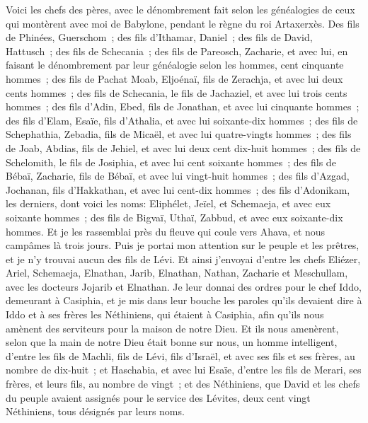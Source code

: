 \begin{multicols}{2}
\VerseOne{}Voici les chefs des pères, avec le dénombrement fait selon les généalogies de ceux qui montèrent avec moi de Babylone, pendant le règne du roi Artaxerxès.
Des fils de Phinées, Guerschom~; des fils d'Ithamar, Daniel~; des fils de David, Hattusch~;
des fils de Schecania~; des fils de Pareosch, Zacharie, et avec lui, en faisant le dénombrement par leur généalogie selon les hommes, cent cinquante hommes~;
des fils de Pachat Moab, Eljoénaï, fils de Zerachja, et avec lui deux cents hommes~;
des fils de Schecania, le fils de Jachaziel, et avec lui trois cents hommes~;
des fils d'Adin, Ebed, fils de Jonathan, et avec lui cinquante hommes~;
des fils d'Elam, Esaïe, fils d'Athalia, et avec lui soixante-dix hommes~;
des fils de Schephathia, Zebadia, fils de Micaël, et avec lui quatre-vingts hommes~;
des fils de Joab, Abdias, fils de Jehiel, et avec lui deux cent dix-huit hommes~;
des fils de Schelomith, le fils de Josiphia, et avec lui cent soixante hommes~;
des fils de Bébaï, Zacharie, fils de Bébaï, et avec lui vingt-huit hommes~;
des fils d'Azgad, Jochanan, fils d'Hakkathan, et avec lui cent-dix hommes~;
des fils d'Adonikam, les derniers, dont voici les noms: Eliphélet, Jeïel, et Schemaeja, et avec eux soixante hommes~;
des fils de Bigvaï, Uthaï, Zabbud, et avec eux soixante-dix hommes.
Et je les rassemblai près du fleuve qui coule vers Ahava, et nous campâmes là trois jours. Puis je portai mon attention sur le peuple et les prêtres, et je n'y trouvai aucun des fils de Lévi.
Et ainsi j'envoyai d'entre les chefs Eliézer, Ariel, Schemaeja, Elnathan, Jarib, Elnathan, Nathan, Zacharie et Meschullam, avec les docteurs Jojarib et Elnathan.
Je leur donnai des ordres pour le chef Iddo, demeurant à Casiphia, et je mis dans leur bouche les paroles qu'ils devaient dire à Iddo et à ses frères les Néthiniens, qui étaient à Casiphia, afin qu'ils nous amènent des serviteurs pour la maison de notre Dieu.
 Et ils nous amenèrent, selon que la main de notre Dieu était bonne sur nous, un homme intelligent, d'entre les fils de Machli, fils de Lévi, fils d'Israël, et avec ses fils et ses frères, au nombre de dix-huit~;
et Haschabia, et avec lui Esaïe, d'entre les fils de Merari, ses frères, et leurs fils, au nombre de vingt~;
et des Néthiniens, que David et les chefs du peuple avaient assignés pour le service des Lévites, deux cent vingt Néthiniens, tous désignés par leurs noms.

\end{multicols}
